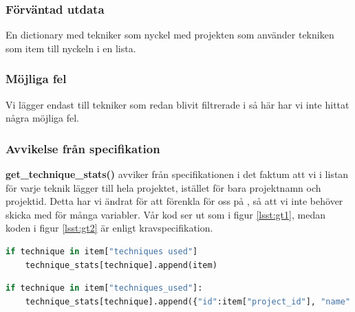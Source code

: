 \documentclass{TDP003mall}
\begin{document}
\subsubsection{Förväntad utdata}
En dictionary med tekniker som nyckel med projekten som använder tekniken som item till nyckeln i en lista. 
\subsubsection{Möjliga fel}
Vi lägger endast till tekniker som redan blivit filtrerade i \uline{} så här har vi inte hittat några möjliga fel.
\subsubsection{Avvikelse från specifikation}
\textbf{get\_technique\_stats()} avviker från  specifikationen i det faktum att vi i listan för varje teknik lägger till hela projektet, istället för bara projektnamn och projektid. Detta har vi ändrat för att förenkla för oss på \uline{}, så att vi inte behöver skicka med för många variabler. Vår kod ser ut som i figur \ref{lsst:gt1}, medan koden i figur \ref{lsst:gt2} är enligt kravspecifikation.
\begin{lstlisting}[caption={Vår lösning på get\_technique\_stats().}, label={lsst:gt1}, language=Python]
if technique in item["techniques used"]
    technique_stats[technique].append(item)
\end{lstlisting}
\begin{lstlisting}[caption={Lösningen enligt kravspecifikationen.}, label={lsst:gt2}, language=Python]
if technique in item["techniques_used"]:
    technique_stats[technique].append({"id":item["project_id"], "name":item["project_name"]})
\end{lstlisting}
\end{document}

